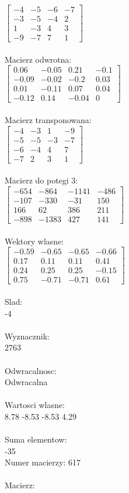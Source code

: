 \documentclass[a4paper,12pt]{article}
\begin{document}
$\begin{bmatrix} -4&-5&-6&-7\\-3&-5&-4&2\\1&-3&4&3\\-9&-7&7&1 \end{bmatrix}$
\\
\\
Macierz odwrotna:\\

$\begin{bmatrix} 0.06&-0.05&0.21&-0.1\\-0.09&-0.02&-0.2&0.03\\0.01&-0.11&0.07&0.04\\-0.12&0.14&-0.04&0 \end{bmatrix}$
\\
\\
Macierz transponowana:\\

$\begin{bmatrix} -4&-3&1&-9\\-5&-5&-3&-7\\-6&-4&4&7\\-7&2&3&1 \end{bmatrix}$
\\
\\
Macierz do potegi 3:\\

$\begin{bmatrix} -654&-864&-1141&-486\\-107&-330&-31&150\\166&62&386&211\\-898&-1383&427&141 \end{bmatrix}$
\\
\\
Wektory wlasne:\\

$\begin{bmatrix} -0.59&-0.65&-0.65&-0.66\\0.17&0.11&0.11&0.41\\0.24&0.25&0.25&-0.15\\0.75&-0.71&-0.71&0.61 \end{bmatrix}$
\\
\\
Slad:\\
-4
\\
\\
Wyznacznik:\\
2763
\\
\\
Odwracalnosc:\\
Odwracalna
\\
\\
Wartosci wlasne:\\
8.78 -8.53 -8.53 4.29
\\
\\
Suma elementow:\\
-35
\\
\newpage
Numer macierzy:
617
\\
\\
Macierz:\\
\end{document}
